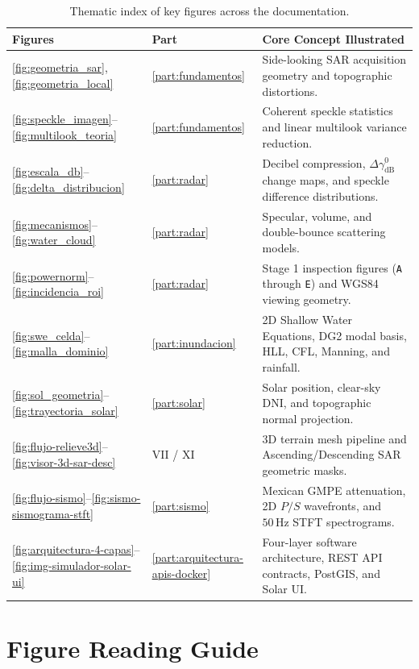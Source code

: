 \documentclass[11pt,a4paper]{article}
\newcommand{\unit}[1]{\mathrm{#1}}
\begin{document}
\begin{table}[htbp]
\centering\small
\begin{tabularx}{\linewidth}{p{.28\linewidth}p{.18\linewidth}X}
\toprule
\textbf{Figures} & \textbf{Part} & \textbf{Core Concept Illustrated}\\\midrule
\ref{fig:geometria_sar}, \ref{fig:geometria_local} & \ref{part:fundamentos} & Side-looking SAR acquisition geometry and topographic distortions.\\
\ref{fig:speckle_imagen}--\ref{fig:multilook_teoria} & \ref{part:fundamentos} & Coherent speckle statistics and linear multilook variance reduction.\\
\ref{fig:escala_db}--\ref{fig:delta_distribucion} & \ref{part:radar} & Decibel compression, $\Delta\gamma^0_{\mathrm{dB}}$ change maps, and speckle difference distributions.\\
\ref{fig:mecanismos}--\ref{fig:water_cloud} & \ref{part:radar} & Specular, volume, and double-bounce scattering models.\\
\ref{fig:powernorm}--\ref{fig:incidencia_roi} & \ref{part:radar} & Stage 1 inspection figures (\texttt{A} through \texttt{E}) and WGS84 viewing geometry.\\
\ref{fig:swe_celda}--\ref{fig:malla_dominio} & \ref{part:inundacion} & 2D Shallow Water Equations, DG2 modal basis, HLL, CFL, Manning, and rainfall.\\
\ref{fig:sol_geometria}--\ref{fig:trayectoria_solar} & \ref{part:solar} & Solar position, clear-sky DNI, and topographic normal projection.\\
\ref{fig:flujo-relieve3d}--\ref{fig:visor-3d-sar-desc} & VII / XI & 3D terrain mesh pipeline and Ascending/Descending SAR geometric masks.\\
\ref{fig:flujo-sismo}--\ref{fig:sismo-sismograma-stft} & \ref{part:sismo} & Mexican GMPE attenuation, 2D $P/S$ wavefronts, and $50\,\unit{Hz}$ STFT spectrograms.\\
\ref{fig:arquitectura-4-capas}--\ref{fig:img-simulador-solar-ui} & \ref{part:arquitectura-apis-docker} & Four-layer software architecture, REST API contracts, PostGIS, and Solar UI.\\\bottomrule
\end{tabularx}
\caption{Thematic index of key figures across the documentation.}
\label{tab:mapa-figuras}
\end{table}


\section{Figure Reading Guide}
\label{sec:guia-figuras}
\end{document}
